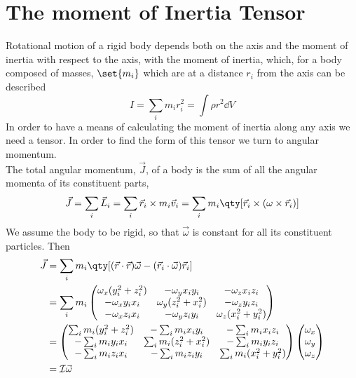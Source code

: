\section{The moment of Inertia Tensor}
\label{sec:moment-inert-tens}

Rotational motion of a rigid body depends both on the axis and the
moment of inertia with respect to the axis, with the moment of
inertia, which, for a body composed of masses, $\set{m_i}$ which are
at a distance $r_i$ from the axis can be described
\begin{equation}
  \label{eq:2}
  I = \sum_i m_i r_i^2 = \int \rho r^2 \dd{V}
\end{equation}
In order to have a means of calculating the moment of inertia along
any axis we need a tensor.  In order to find the form of this tensor
we turn to angular momentum.\\
The total angular momentum, $\vec{J}$, of a body is the sum of all the
angular momenta of its constituent parts,
\[ \vec{J} = \sum_i \vec{L}_i = \sum_i \vec{r}_i \times m_i \vec{v}_i
= \sum_i m_i \qty[ \vec{r}_i \times (\omega \times \vec{r}_i)] \] We
assume the body to be rigid, so that $\vec{\omega}$ is constant for all its
constituent particles. Then
{\small
\begin{align*} 
\vec{J} &= \sum_i m_i \qty[ (\vec{r} \cdot \vec{r}) \vec{\omega} -
(\vec{r}_i \cdot \vec{\omega} ) \vec{r}_i] \\
&= \sum_i m_i 
\begin{pmatrix}
  \omega_x (y_i^2 + z_i^2 ) & - \omega_y x_i y_i & - \omega_z x_i z_i \\
  - \omega_x y_i x_i & \omega_y (z_i^2 + x_i^2) & - \omega_z y_i z_i \\
  - \omega_x z_i x_i & - \omega_y z_i y_i & \omega_z (x_i^2 + y_i^2)
\end{pmatrix}\\
&=
\begin{pmatrix}
  \sum_i m_i  (y_i^2 + z_i^2 ) & - \sum_i m_i  x_i y_i & - \sum_i m_i  x_i z_i \\
  - \sum_i m_i  y_i x_i & \sum_i m_i  (z_i^2 + x_i^2) & - \sum_i m_i  y_i z_i \\
  - \sum_i m_i z_i x_i & - \sum_i m_i  z_i y_i & \sum_i m_i  (x_i^2 + y_i^2)
\end{pmatrix}
\begin{pmatrix}
  \omega_x \\ \omega_y \\ \omega_z
\end{pmatrix} \\&= {\cal I} \vec{\omega}
\end{align*}
}
